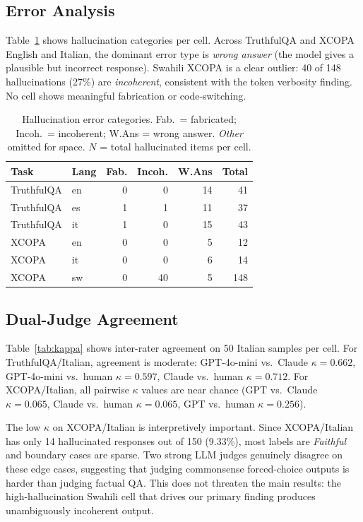 \documentclass[11pt]{article}
\begin{document}
\subsection{Error Analysis}

Table~\ref{tab:errors} shows hallucination categories per cell. Across
TruthfulQA and XCOPA English and Italian, the dominant error type is
\textit{wrong answer} (the model gives a plausible but incorrect response).
Swahili XCOPA is a clear outlier: 40 of 148 hallucinations (27\%) are
\textit{incoherent}, consistent with the token verbosity finding. No cell
shows meaningful fabrication or code-switching.

\begin{table}[t]
\centering
\small
\begin{tabular}{llrrrr}
\toprule
\textbf{Task} & \textbf{Lang} & \textbf{Fab.} & \textbf{Incoh.} & \textbf{W.Ans} & \textbf{Total} \\
\midrule
TruthfulQA & en & 0 &  0 & 14 &  41 \\
TruthfulQA & es & 1 &  1 & 11 &  37 \\
TruthfulQA & it & 1 &  0 & 15 &  43 \\
\midrule
XCOPA      & en & 0 &  0 &  5 &  12 \\
XCOPA      & it & 0 &  0 &  6 &  14 \\
XCOPA      & sw & 0 & 40 &  5 & 148 \\
\bottomrule
\end{tabular}
\caption{Hallucination error categories. Fab.\ = fabricated; Incoh.\ =
incoherent; W.Ans = wrong answer. \textit{Other} omitted for space.
$N$ = total hallucinated items per cell.}
\label{tab:errors}
\end{table}

\subsection{Dual-Judge Agreement}

Table~\ref{tab:kappa} shows inter-rater agreement on 50 Italian samples per
cell. For TruthfulQA/Italian, agreement is moderate: GPT-4o-mini vs.\ Claude
$\kappa=0.662$, GPT-4o-mini vs.\ human $\kappa=0.597$, Claude vs.\ human
$\kappa=0.712$. For XCOPA/Italian, all pairwise $\kappa$ values are near
chance (GPT vs.\ Claude $\kappa=0.065$, Claude vs.\ human $\kappa=0.065$,
GPT vs.\ human $\kappa=0.256$).

The low $\kappa$ on XCOPA/Italian is interpretively important. Since
XCOPA/Italian has only 14 hallucinated responses out of 150 (9.33\%), most
labels are \textit{Faithful} and boundary cases are sparse. Two strong LLM
judges genuinely disagree on these edge cases, suggesting that judging
commonsense forced-choice outputs is harder than judging factual QA. This does
not threaten the main results: the high-hallucination Swahili cell that drives
our primary finding produces unambiguously incoherent output.
\end{document}
